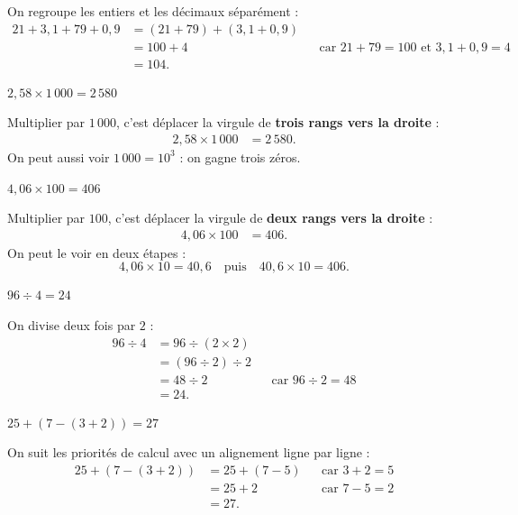 \documentclass[answers]{exam}
\begin{document}
\begin{questions}
  \begin{solution}
  On regroupe les entiers et les décimaux séparément :
  \begin{align*}
    21 + 3{,}1 + 79 + 0{,}9
      &= (21 + 79) + (3{,}1 + 0{,}9) \\
      &= 100 + 4 &&\text{car } 21 + 79 = 100 \text{ et } 3{,}1 + 0{,}9 = 4 \\
      &= 104.
  \end{align*}
  \end{solution}

  \question $2{,}58 \times 1\,000 = \boxed{2\,580}$

  \begin{solution}
  Multiplier par $1\,000$, c'est déplacer la virgule de \textbf{trois rangs vers la droite} :
  \begin{align*}
    2{,}58 \times 1\,000 &= 2\,580.
  \end{align*}
  On peut aussi voir $1\,000 = 10^3$ : on gagne trois zéros.
  \end{solution}

  \question $4{,}06 \times 100 = \boxed{406}$

  \begin{solution}
  Multiplier par $100$, c'est déplacer la virgule de \textbf{deux rangs vers la droite} :
  \begin{align*}
    4{,}06 \times 100 &= 406.
  \end{align*}
  On peut le voir en deux étapes :
  \[
    4{,}06 \times 10 = 40{,}6 \quad\text{puis}\quad 40{,}6 \times 10 = 406.
  \]
  \end{solution}

  \question $96 \div 4 = \boxed{24}$

  \begin{solution}
  On divise deux fois par $2$ :
  \begin{align*}
    96 \div 4 
      &= 96 \div (2 \times 2) \\
      &= (96 \div 2) \div 2 \\
      &= 48 \div 2 &&\text{car } 96 \div 2 = 48 \\
      &= 24.
  \end{align*}
  \end{solution}

  \question $25 + (7 - (3 + 2)) = \boxed{27}$

  \begin{solution}
  On suit les priorités de calcul avec un alignement ligne par ligne :
  \begin{align*}
    25 + (7 - (3 + 2))
      &= 25 + (7 - 5) &&\text{car } 3 + 2 = 5 \\
      &= 25 + 2 &&\text{car } 7 - 5 = 2 \\
      &= 27.
  \end{align*}
  \end{solution}


\end{questions}
\end{document}
